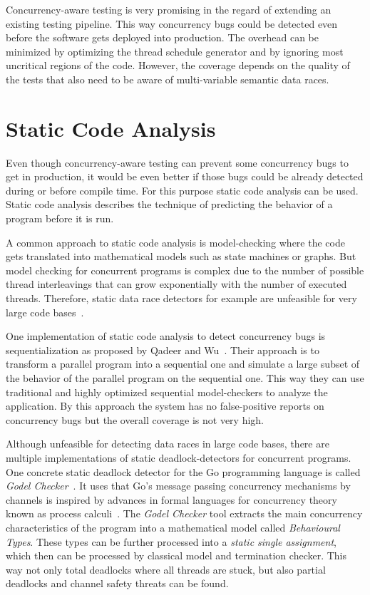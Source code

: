 \documentclass[conference]{IEEEtran}
\begin{document}
Concurrency-aware testing is very promising in the regard of extending an existing testing pipeline.
This way concurrency bugs could be detected even before the software gets deployed into production.
The overhead can be minimized by optimizing the thread schedule generator and by ignoring most uncritical regions of the code.
However, the coverage depends on the quality of the tests that also need to be aware of multi-variable semantic data races.


\section{Static Code Analysis}
\label{sct:static}

Even though concurrency-aware testing can prevent some concurrency bugs to get in production, it would be even better if those bugs could be already detected during or before compile time.
For this purpose static code analysis can be used.
Static code analysis describes the technique of predicting the behavior of a program before it is run.

A common approach to static code analysis is model-checking where the code gets translated into mathematical models such as state machines or graphs.
But model checking for concurrent programs is complex due to the number of possible thread interleavings that can grow exponentially with the number of executed threads.
Therefore, static data race detectors for example are unfeasible for very large code bases~\cite{serebry2009threadsanitizer}.

One implementation of static code analysis to detect concurrency bugs is sequentialization as proposed by Qadeer and Wu~\cite{qadeer2004kiss}.
Their approach is to transform a parallel program into a sequential one and simulate a large subset of the behavior of the parallel program on the sequential one.
This way they can use traditional and highly optimized sequential model-checkers to analyze the application.
By this approach the system has no false-positive reports on concurrency bugs but the overall coverage is not very high.

Although unfeasible for detecting data races in large code bases, there are multiple implementations of static deadlock-detectors for concurrent programs.
One concrete static deadlock detector for the Go programming language is called \emph{Godel Checker}~\cite{godelChecker}.
It uses that Go's message passing concurrency mechanisms by channels is inspired by advances in formal languages for concurrency theory known as process calculi~\cite{lange2018verification}.
The \emph{Godel Checker} tool extracts the main concurrency characteristics of the program into a mathematical model called \emph{Behavioural Types}.
These types can be further processed into a \emph{static single assignment}, which then can be processed by classical model and termination checker.
This way not only total deadlocks where all threads are stuck, but also partial deadlocks and channel safety threats can be found.
\end{document}
